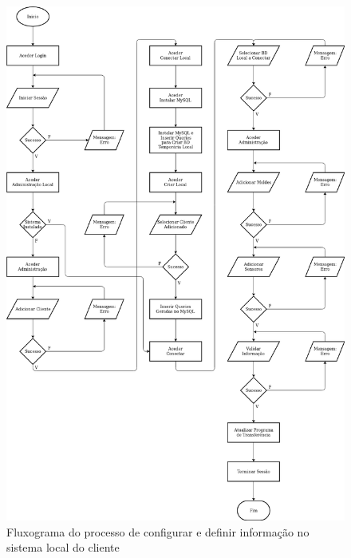 \documentclass[11pt,twoside,a4paper]{report}
\begin{document}
\begin{figure}
	\vspace{-2.5cm}
	\begin{center}
		\includegraphics[width=1\textwidth]{fluxograma_administracao03} %
		\caption[Fluxograma do processo de configurar e definir informação no sistema local do cliente]{Fluxograma do processo de configurar e definir informação no sistema local do cliente}
		\label{fig:aplicacao_admin}
	\end{center}
\end{figure}

\newpage
\end{document}
